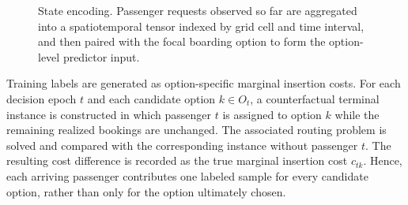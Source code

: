 \documentclass[preprint,12pt,authoryear]{elsarticle}
\begin{document}
\begin{figure}[t]
\centering
{}
\caption{State encoding. Passenger requests observed so far are aggregated into a spatiotemporal tensor indexed by grid cell and time interval, and then paired with the focal boarding option to form the option-level predictor input.}
\label{fig:encoding}
\end{figure}

Training labels are generated as option-specific marginal insertion costs. For each decision epoch $t$ and each candidate option $k\in O_t$, a counterfactual terminal instance is constructed in which passenger $t$ is assigned to option $k$ while the remaining realized bookings are unchanged. The associated routing problem is solved and compared with the corresponding instance without passenger $t$. The resulting cost difference is recorded as the true marginal insertion cost $c_{tk}$. Hence, each arriving passenger contributes one labeled sample for every candidate option, rather than only for the option ultimately chosen.
\end{document}
